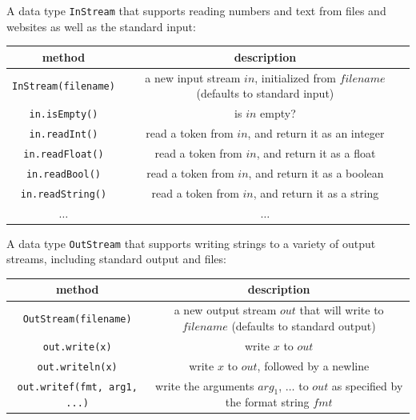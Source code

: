 \documentclass[8pt,a4paper,compress,handout]{beamer}
\begin{document}
\begin{frame}[fragile]
A data type \lstinline{InStream} that supports reading numbers and text from files and websites as well as the standard input:
\begin{center}
\begin{tabular}{cc}
method & description \\ \hline
\lstinline$InStream(filename)$ & \makecell{a new input stream $in$, initialized \\ from $filename$ (defaults to standard input)} \\
\lstinline$in.isEmpty()$ & is $in$ empty? \\
\lstinline$in.readInt()$ & read a token from $in$, and return it as an integer \\
\lstinline$in.readFloat()$ & read a token from $in$, and return it as a float \\
\lstinline$in.readBool()$ & read a token from $in$, and return it as a boolean \\
\lstinline$in.readString()$ & read a token from $in$, and return it as a string \\
$\dots$ & $\dots$
\end{tabular} 
\end{center}

\bigskip

A data type \lstinline{OutStream} that supports writing strings to a variety of output streams, including standard output and files:
\begin{center}
\begin{tabular}{cc}
method & description \\ \hline
\lstinline$OutStream(filename)$ & \makecell{a new output stream $out$ that will write \\ to $filename$ (defaults to standard output)} \\
\lstinline$out.write(x)$ & write $x$ to $out$ \\
\lstinline$out.writeln(x)$ & write $x$ to $out$, followed by a newline \\
\lstinline$out.writef(fmt, arg1, ...)$ & \makecell{write the arguments $arg_1$, $\dots$ to $out$ as \\ specified by the format string $fmt$}
\end{tabular} 
\end{center}
\end{frame}
\end{document}
